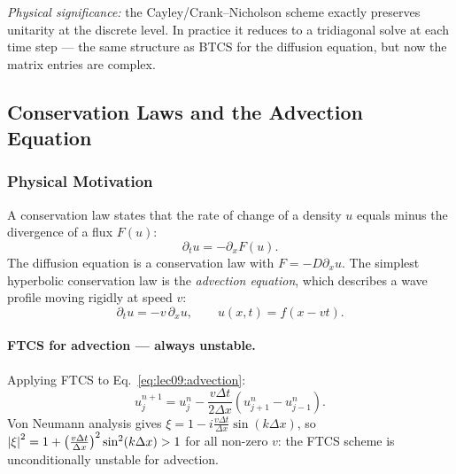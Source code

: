\textit{Physical significance:} the Cayley/Crank--Nicholson scheme
exactly preserves unitarity at the discrete level.  In practice it
reduces to a tridiagonal solve at each time step — the same structure
as BTCS for the diffusion equation, but now the matrix entries are
complex.

\subsection{Conservation Laws and the Advection Equation}
\label{subsec:lec09:advection}

\subsubsection*{Physical Motivation}
A conservation law states that the rate of change of a density $u$
equals minus the divergence of a flux $F(u)$:
\begin{equation}
  \partial_t u = -\partial_x F(u).
  \label{eq:lec09:conservation-law}
\end{equation}
The diffusion equation is a conservation law with $F=-D\partial_x u$.
The simplest hyperbolic conservation law is the \emph{advection
equation}, which describes a wave profile moving rigidly at speed $v$:
\begin{equation}
  \partial_t u = -v\,\partial_x u,
  \qquad
  u(x,t) = f(x-vt).
  \label{eq:lec09:advection}
\end{equation}

\paragraph{FTCS for advection — always unstable.}
Applying FTCS to Eq.~\eqref{eq:lec09:advection}:
\begin{equation}
  u_j^{n+1} = u_j^n
  - \frac{v\Delta t}{2\Delta x}\!\left(u_{j+1}^n - u_{j-1}^n\right).
  \label{eq:lec09:advection-ftcs}
\end{equation}
Von Neumann analysis gives
$\xi = 1-i\frac{v\Delta t}{\Delta x}\sin(k\Delta x)$,
so $\left|\xi\right|^2 = 1 + \left(\frac{v\Delta t}{\Delta x}\right)^2\sin^2(k\Delta x) > 1$
for all non-zero $v$: the FTCS scheme is unconditionally unstable for
advection.

